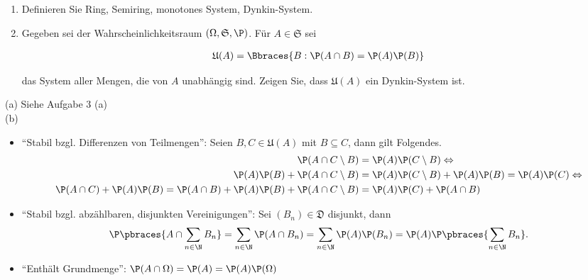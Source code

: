 
\begin{exercise}

\phantom{}

\begin{enumerate}[label = (\alph*)]

  \item
  Definieren Sie Ring, Semiring, monotones System, Dynkin-System.
  
  \item
  Gegeben sei der Wahrscheinlichkeitsraum $(\Omega, \mathfrak{S}, \P)$. Für $A \in \mathfrak{S}$ sei
  
  \begin{align*}
    \mathfrak{U}(A) = \Bbraces{B: \P(A \cap B) = \P(A) \P(B)}
  \end{align*}
  
  das System aller Mengen, die von $A$ unabhängig sind. Zeigen Sie, dass $\mathfrak{U}(A)$ ein Dynkin-System ist.

\end{enumerate}

\end{exercise}


\begin{solution}

(a) Siehe Aufgabe 3 (a) \\

(b)

\begin{itemize}

  \item \enquote{Stabil bzgl. Differenzen von Teilmengen}: Seien $B, C \in \mathfrak{U}(A)$ mit $B \subseteq C$, dann gilt Folgendes.
  \begin{align*}
    \P(A \cap C \setminus B)
    & = \P(A) \P(C \setminus B)
    \Leftrightarrow \\
    \P(A) \P(B) + \P(A \cap C \setminus B)
    & = \P(A) \P(C \setminus B) + \P(A) \P(B)
      = \P(A) \P(C)
    \Leftrightarrow \\
    \P(A \cap C) + \P(A) \P(B)
      =\P(A \cap B) + \P(A) \P(B) + \P(A \cap C \setminus B)
    & = \P(A) \P(C) + \P(A \cap B)
  \end{align*}

  \item \enquote{Stabil bzgl. abzählbaren, disjunkten Vereinigungen}: Sei $(B_n) \in \mathfrak{D}$ disjunkt, dann
  \begin{align*}
    \P \pbraces{A \cap \sum_{n \in \N} B_n}
    =
    \sum_{n \in \N} \P(A \cap B_n)
    =
    \sum_{n \in \N} \P(A) \P(B_n)
    =
    \P(A) \P \pbraces{\sum_{n \in \N} B_n}.
  \end{align*}

  \item \enquote{Enthält Grundmenge}: $\P(A \cap \Omega) = \P(A) = \P(A) \P(\Omega)$

\end{itemize}

\end{solution}

